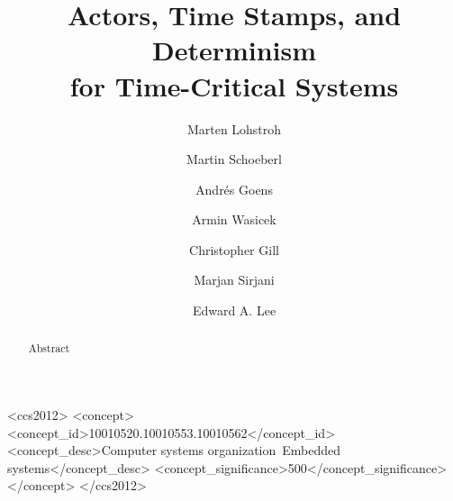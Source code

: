 \documentclass[sigconf]{acmart}
\begin{document}
\title{Actors, Time Stamps, and Determinism \\ for Time-Critical Systems}


\author{Marten Lohstroh}


\author{Martin Schoeberl}

\author{Andr\'es Goens}
\orcid{}

\author{Armin Wasicek}
\orcid{}

\author{Christopher Gill}
\orcid{}


\author{Marjan Sirjani}
\orcid{}


\author{Edward A. Lee}



\renewcommand{\shortauthors}{E. A. Lee et al.}

\begin{abstract}
Abstract
\end{abstract}

%
%
\begin{CCSXML}
	<ccs2012>
	<concept>
	<concept_id>10010520.10010553.10010562</concept_id>
	<concept_desc>Computer systems organization~Embedded systems</concept_desc>
	<concept_significance>500</concept_significance>
	</concept>
	</ccs2012>  
\end{CCSXML}
\end{document}
